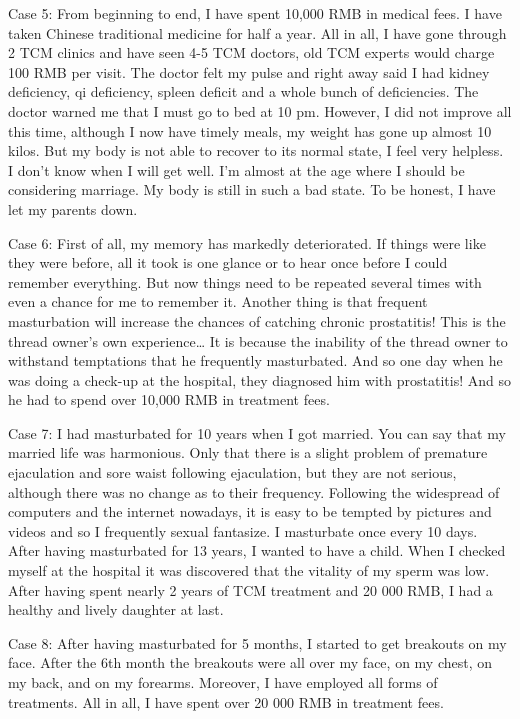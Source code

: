 \documentclass[
]{book}
\begin{document}
Case 5: From beginning to end, I have spent 10,000 RMB in medical fees. I have taken Chinese traditional medicine for half a year. All in all, I have gone through 2 TCM clinics and have seen 4-5 TCM doctors, old TCM experts would charge 100 RMB per visit. The doctor felt my pulse and right away said I had kidney deficiency, qi deficiency, spleen deficit and a whole bunch of deficiencies. The doctor warned me that I must go to bed at 10 pm. However, I did not improve all this time, although I now have timely meals, my weight has gone up almost 10 kilos. But my body is not able to recover to its normal state, I feel very helpless. I don't know when I will get well. I'm almost at the age where I should be considering marriage. My body is still in such a bad state. To be honest, I have let my parents down.

Case 6: First of all, my memory has markedly deteriorated. If things were like they were before, all it took is one glance or to hear once before I could remember everything. But now things need to be repeated several times with even a chance for me to remember it. Another thing is that frequent masturbation will increase the chances of catching chronic prostatitis! This is the thread owner's own experience\ldots{} It is because the inability of the thread owner to withstand temptations that he frequently masturbated. And so one day when he was doing a check-up at the hospital, they diagnosed him with prostatitis! And so he had to spend over 10,000 RMB in treatment fees.

Case 7: I had masturbated for 10 years when I got married. You can say that my married life was harmonious. Only that there is a slight problem of premature ejaculation and sore waist following ejaculation, but they are not serious, although there was no change as to their frequency. Following the widespread of computers and the internet nowadays, it is easy to be tempted by pictures and videos and so I frequently sexual fantasize. I masturbate once every 10 days. After having masturbated for 13 years, I wanted to have a child. When I checked myself at the hospital it was discovered that the vitality of my sperm was low. After having spent nearly 2 years of TCM treatment and 20 000 RMB, I had a healthy and lively daughter at last.

Case 8: After having masturbated for 5 months, I started to get breakouts on my face. After the 6th month the breakouts were all over my face, on my chest, on my back, and on my forearms. Moreover, I have employed all forms of treatments. All in all, I have spent over 20 000 RMB in treatment fees.
\end{document}
